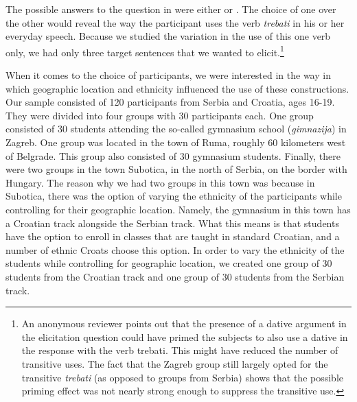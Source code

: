 \documentclass[output=paper,
modfonts,
newtxmath,
hidelinks,
]{langscibook}
\begin{document}
\ea \label{ex7}
	\z
\z

\noindent The possible answers to the question in  were either  or . The choice of one over the other would reveal the way the participant uses the verb \textit{trebati} in his or her everyday speech. Because we studied the variation in the use of this one verb only, we had only three target sentences that we wanted to elicit.\footnote{\label{fn2}An anonymous reviewer points out that the presence of a dative argument in the elicitation question could have primed the subjects to also use a dative in the response with the verb trebati. This might have reduced the number of transitive uses. The fact that the Zagreb group still largely opted for the transitive \textit{trebati} (as opposed to groups from Serbia) shows that the possible priming effect was not nearly strong enough to suppress the transitive use.}

When it comes to the choice of participants, we were interested in the way in which geographic location and ethnicity influenced the use of these constructions. Our sample consisted of 120 participants from Serbia and Croatia, ages 16-19. They were divided into four groups with 30 participants each. One group consisted of 30 students attending the so-called gymnasium school (\textit{gimnazija}) in Zagreb. One group was located in the town of Ruma, roughly 60 kilometers west of Belgrade. This group also consisted of 30 gymnasium students. Finally, there were two groups in the town Subotica, in the north of Serbia, on the border with Hungary. The reason why we had two groups in this town was because in Subotica, there was the option of varying the ethnicity of the participants while controlling for their geographic location. Namely, the gymnasium in this town has a Croatian track alongside the Serbian track. What this means is that students have the option to enroll in classes that are taught in standard Croatian, and a number of ethnic Croats choose this option. In order to vary the ethnicity of the students while controlling for geographic location, we created one group of 30 students from the Croatian track and one group of 30 students from the Serbian track. 
\end{document}
